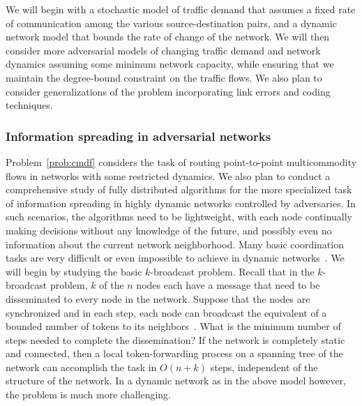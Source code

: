 
We will begin with a stochastic model of traffic demand that assumes a
fixed rate of communication among the various source-destination
pairs, and a dynamic network model that bounds the rate of change of
the network.  We will then consider more adversarial models of
changing traffic demand and network dynamics assuming some minimum
network capacity, while ensuring that we maintain the degree-bound
constraint on the traffic flows.  We also plan to consider
generalizations of the problem incorporating link errors and coding
techniques.



\subsubsection{Information spreading in adversarial networks}
\label{sec:spreading}
Problem~\ref{prob:cmdf} considers the task of routing point-to-point
multicommodity flows in networks with some restricted dynamics.  We
also plan to conduct a comprehensive study of fully distributed
algorithms for the more specialized task of information spreading in
highly dynamic networks controlled by adversaries.  In such scenarios,
the algorithms need to be lightweight, with each node continually
making decisions without any knowledge of the future, and possibly
even no information about the current network neighborhood.  Many
basic coordination tasks are very difficult or even impossible to
achieve in dynamic networks~\cite{fich+r:impossibility}.  We will
begin by studying the basic $k$-broadcast problem.  Recall that in the
$k$-broadcast problem, $k$ of the $n$ nodes each have a message that
need to be disseminated to every node in the network.  Suppose that
the nodes are synchronized and in each step, each node can broadcast
the equivalent of a bounded number of tokens to its
neighbors~\cite{kuhn+lo:dynamic}.  What is the minimum number of steps
needed to complete the dissemination?  If the network is completely
static and connected, then a local token-forwarding process on a
spanning tree of the network can accomplish the task in $O(n + k)$
steps, independent of the structure of the network.  In a dynamic
network as in the above model however, the problem is much more
challenging.

